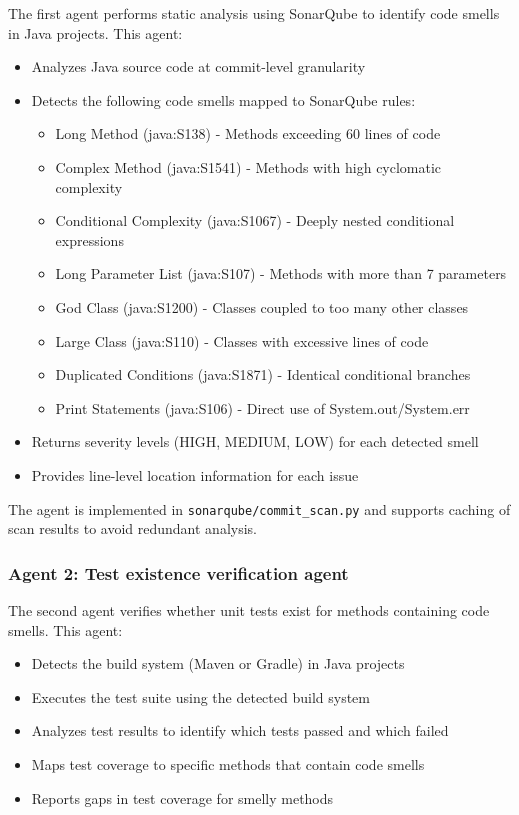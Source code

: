 The first agent performs static analysis using SonarQube to identify code smells in Java projects. This agent:

\begin{itemize}
    \item Analyzes Java source code at commit-level granularity
    \item Detects the following code smells mapped to SonarQube rules:
    \begin{itemize}
        \item Long Method (java:S138) - Methods exceeding 60 lines of code
        \item Complex Method (java:S1541) - Methods with high cyclomatic complexity
        \item Conditional Complexity (java:S1067) - Deeply nested conditional expressions
        \item Long Parameter List (java:S107) - Methods with more than 7 parameters
        \item God Class (java:S1200) - Classes coupled to too many other classes
        \item Large Class (java:S110) - Classes with excessive lines of code
        \item Duplicated Conditions (java:S1871) - Identical conditional branches
        \item Print Statements (java:S106) - Direct use of System.out/System.err
    \end{itemize}
    \item Returns severity levels (HIGH, MEDIUM, LOW) for each detected smell
    \item Provides line-level location information for each issue
\end{itemize}

The agent is implemented in \texttt{sonarqube/commit\_scan.py} and supports caching of scan results to avoid redundant analysis.

\subsubsection{Agent 2: Test existence verification agent}

The second agent verifies whether unit tests exist for methods containing code smells. This agent:

\begin{itemize}
    \item Detects the build system (Maven or Gradle) in Java projects
    \item Executes the test suite using the detected build system
    \item Analyzes test results to identify which tests passed and which failed
    \item Maps test coverage to specific methods that contain code smells
    \item Reports gaps in test coverage for smelly methods
\end{itemize}

